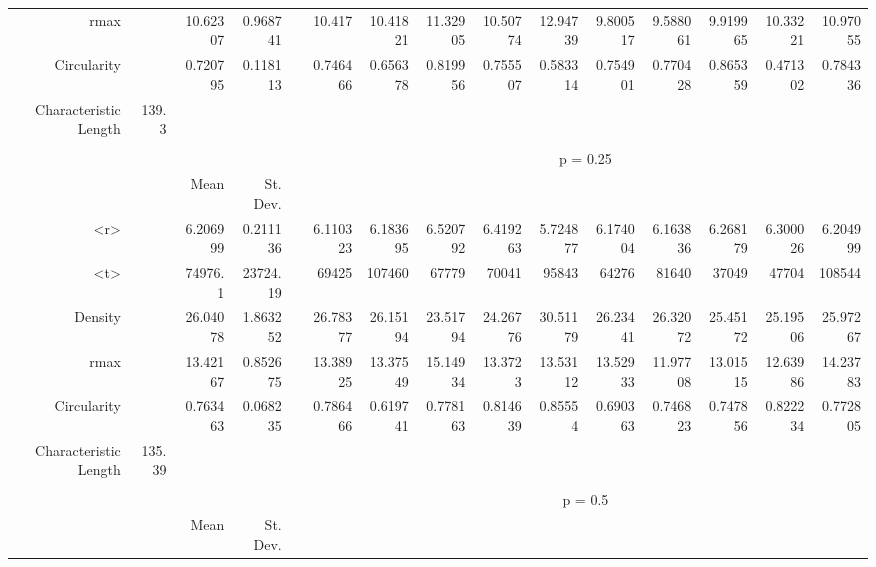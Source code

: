 \begin{table}[htbp]
\begin{tabular}{rrrrrrrrrrrrrrr}
    rmax  &       & 10.62307 & 0.968741 &       & 10.417 & 10.41821 & 11.32905 & 10.50774 & 12.94739 & 9.800517 & 9.588061 & 9.919965 & 10.33221 & 10.97055 \\
    Circularity &       & 0.720795 & 0.118113 &       & 0.746466 & 0.656378 & 0.819956 & 0.755507 & 0.583314 & 0.754901 & 0.770428 & 0.865359 & 0.471302 & 0.784336 \\
    Characteristic Length & 139.3 &       &       &       &       &       &       &       &       &       &       &       &       &  \\
          &       &       &       &       &       &       &       &       &       &       &       &       &       &  \\
          &       &       &       &       & \multicolumn{10}{c}{p = 0.25} \\
          &       & Mean  & St. Dev. &       &       &       &       &       &       &       &       &       &       &  \\
    <r>   &       & 6.206999 & 0.211136 &       & 6.110323 & 6.183695 & 6.520792 & 6.419263 & 5.724877 & 6.174004 & 6.163836 & 6.268179 & 6.300026 & 6.204999 \\
    <t>   &       & 74976.1 & 23724.19 &       & 69425 & 107460 & 67779 & 70041 & 95843 & 64276 & 81640 & 37049 & 47704 & 108544 \\
    Density &       & 26.04078 & 1.863252 &       & 26.78377 & 26.15194 & 23.51794 & 24.26776 & 30.51179 & 26.23441 & 26.32072 & 25.45172 & 25.19506 & 25.97267 \\
    rmax  &       & 13.42167 & 0.852675 &       & 13.38925 & 13.37549 & 15.14934 & 13.3723 & 13.53112 & 13.52933 & 11.97708 & 13.01515 & 12.63986 & 14.23783 \\
    Circularity &       & 0.763463 & 0.068235 &       & 0.786466 & 0.619741 & 0.778163 & 0.814639 & 0.85554 & 0.690363 & 0.746823 & 0.747856 & 0.822234 & 0.772805 \\
    Characteristic Length & 135.39 &       &       &       &       &       &       &       &       &       &       &       &       &  \\
          &       &       &       &       &       &       &       &       &       &       &       &       &       &  \\
          &       &       &       &       & \multicolumn{10}{c}{p = 0.5} \\
          &       & Mean  & St. Dev. &       &       &       &       &       &       &       &       &       &       &  \\

\end{tabular}
\end{table}
